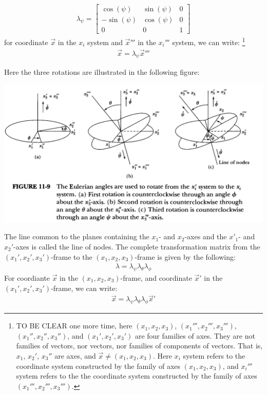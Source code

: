 \documentclass[11pt,oneside]{book}
\theoremstyle{break}
\theoremstyle{break}
\newcommand{\bmat}[1]{\begin{bmatrix}
#1
\end{bmatrix}}
\begin{document}
\begin{enumerate}
\begin{align*}
\lambda_{\psi} = \bmat{\cos(\psi) & \sin(\psi) & 0 \\ -\sin(\psi) & \cos(\psi) & 0 \\ 0 & 0 &1}
\end{align*}
for coordinate $\vec{x}$ in the $x_i$ system and $\vec{x}'''$ in the $x_i'''$ system, we can write: \footnote{TO BE CLEAR one more time, here $(x_1,x_2,x_3)$, $(x_1''',x_2''',x_3''')$, $(x_1'',x_2'', x_3'')$, and $(x_1',x_2',x_3')$ are four families of axes. They are not families of vectors, nor vectors, nor families of components of vectors. That is, $x_1$, $x_2'$, $x_3''$ are axes, and $\vec{x} \neq (x_1,x_2,x_3)$. Here $x_i$ system refers to the coordinate system constructed by the family of axes $(x_1,x_2,x_3)$, and $x_i'''$ system refers to the the coordinate system constructed by the family of axes $(x_1''',x_2''',x_3''')$.}
\begin{align*}
\vec{x} = \lambda_{\psi} \vec{x}'''
\end{align*}
\end{enumerate}
Here the three rotations are illustrated in the following figure:
\begin{center}
\includegraphics[scale=0.35]{eulerian.png}
\end{center}
The line common to the planes containing the $x_1$- and $x_2$-axes and the $x'_1$- and $x_2'$-axes is called the line of nodes. The complete transformation matrix from the $(x_1',x_2',x_3')$-frame to the $(x_1,x_2,x_3)$-frame is given by the following:
\begin{align*}
\lambda = \lambda_{\psi} \lambda_{\theta}\lambda_{\phi}
\end{align*}
For coordiante $\vec{x}$ in the $(x_1,x_2,x_3)$-frame, and coordinate $\vec{x}'$ in the $(x_1',x_2',x_3')$-frame, we can write:
\begin{align*}
\vec{x} = \lambda_{\psi}\lambda_{\theta}\lambda_{\phi} \vec{x}' 
\end{align*}
\end{document}
